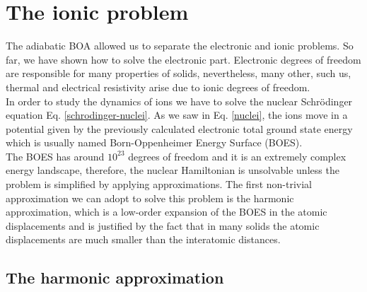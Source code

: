 
\chapter{The ionic problem} %

\label{Chapter3} %


The adiabatic BOA allowed us to separate the electronic and ionic problems. So far, we have shown how to solve the electronic part. Electronic degrees of freedom are responsible for many properties 
of solids, nevertheless, many other, such us, thermal and electrical resistivity arise due to ionic degrees of freedom. \\

In order to study the dynamics of ions we have to solve the nuclear Schr\"odinger equation Eq. \ref{schrodinger-nuclei}. As we saw in Eq. \ref{nuclei}, the ions move in a potential given by the previously calculated 
electronic total ground state energy which is usually named Born-Oppenheimer Energy Surface (BOES). \\

The BOES has around $10^{23}$ degrees of freedom and it is an extremely complex energy landscape, therefore, the nuclear Hamiltonian is unsolvable unless the problem is simplified by applying approximations. The first non-trivial 
approximation we can adopt to solve this problem is the harmonic approximation, which is a low-order expansion of the BOES in the atomic displacements and is justified by the fact that in many solids the atomic displacements are 
much smaller than the interatomic distances\cite{ashcroft1976solid}.

\section{The harmonic approximation}
\label{harmonic-approximation}

